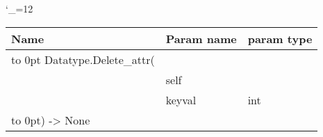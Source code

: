 \begingroup \catcode`\_=12 \tt
\begin{tabular}{lll}
\toprule
\textrm{Name}&\textrm{Param name}&\textrm{param type}\\
\midrule
\hbox to 0pt {Datatype.Delete_attr(\hss}\\
& self\\
& keyval & int\\
\hbox to 0pt{) -> None\hss}\\
\bottomrule
\end{tabular}
\endgroup
